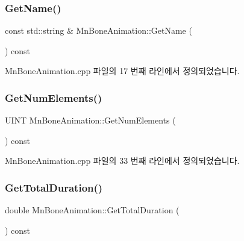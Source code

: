 \subsubsection{\texorpdfstring{Get\+Name()}{GetName()}}
{\footnotesize\ttfamily const std\+::string \& Mn\+Bone\+Animation\+::\+Get\+Name (\begin{DoxyParamCaption}{ }\end{DoxyParamCaption}) const}



Mn\+Bone\+Animation.\+cpp 파일의 17 번째 라인에서 정의되었습니다.

\mbox{\label{class_m_n_l_1_1_mn_bone_animation_a4ab001675acbda970c1a9b41b886d76f}} 
\subsubsection{\texorpdfstring{Get\+Num\+Elements()}{GetNumElements()}}
{\footnotesize\ttfamily U\+I\+NT Mn\+Bone\+Animation\+::\+Get\+Num\+Elements (\begin{DoxyParamCaption}{ }\end{DoxyParamCaption}) const}



Mn\+Bone\+Animation.\+cpp 파일의 33 번째 라인에서 정의되었습니다.

\mbox{\label{class_m_n_l_1_1_mn_bone_animation_a40f42c23266fe578394b127d34eb8208}} 
\subsubsection{\texorpdfstring{Get\+Total\+Duration()}{GetTotalDuration()}}
{\footnotesize\ttfamily double Mn\+Bone\+Animation\+::\+Get\+Total\+Duration (\begin{DoxyParamCaption}{ }\end{DoxyParamCaption}) const}




